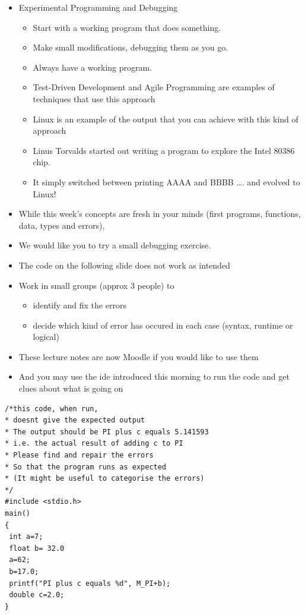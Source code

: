 \documentclass{beamer}
\begin{document}
\begin{frame}
\begin{itemize}
\item Experimental Programming  and Debugging 
\begin{itemize}
\item Start with a working program that does something. 
\item Make small modifications, debugging them as you go. 
\item Always have a working program. 
\item Test-Driven Development and Agile Programming are examples of techniques that use this approach
\item Linux is an example of the output that you can achieve with this kind of approach 
\item Linus Torvalds started out writing a program to explore the Intel 80386 chip. 
\item It simply switched between printing AAAA and BBBB {\dots}. and evolved to Linux! 
\end{itemize}
\end{itemize}
\end{frame}

\begin{frame}
\begin{itemize}
\item While this week's concepts are fresh in your minds (first programs, functions, data, types and errors),
\item We would like you to try a small debugging exercise. 
\item The code on the following slide does not work as intended
\item Work in small groups (approx 3 people) to 
\begin{itemize}
\item identify and fix the errors
\item decide which kind of error has occured in each case (syntax, runtime or logical)
\end{itemize}
\item These lecture notes are now Moodle if you would like to use them
\item And you may use the ide introduced this morning to run the code and get clues about what is going on
\end{itemize}
\end{frame}

\begin{frame}[fragile]

\begin{block}{}
\begin{lstlisting}
/*this code, when run, 
* doesnt give the expected output
* The output should be PI plus c equals 5.141593 
* i.e. the actual result of adding c to PI
* Please find and repair the errors
* So that the program runs as expected
* (It might be useful to categorise the errors)
*/
#include <stdio.h>
main()
{
 int a=7;
 float b= 32.0
 a=62;
 b=17.0;
 printf("PI plus c equals %d", M_PI+b);
 double c=2.0; 
}
\end{lstlisting}
\end{block}
\end{frame}
\end{document}
